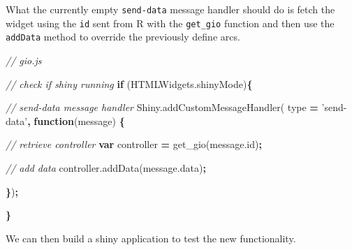 \documentclass[10pt,]{krantz}
\makeatletter
\newenvironment{Shaded}{\begin{snugshade}}{\end{snugshade}}
\newcommand{\AttributeTok}[1]{\textcolor[rgb]{0.61,0.61,0.61}{#1}}
\newcommand{\CommentTok}[1]{\textcolor[rgb]{0.37,0.37,0.37}{\textit{#1}}}
\newcommand{\ControlFlowTok}[1]{\textcolor[rgb]{0.27,0.27,0.27}{\textbf{#1}}}
\newcommand{\KeywordTok}[1]{\textcolor[rgb]{0.27,0.27,0.27}{\textbf{#1}}}
\newcommand{\NormalTok}[1]{#1}
\newcommand{\OperatorTok}[1]{\textcolor[rgb]{0.43,0.43,0.43}{\textbf{#1}}}
\newcommand{\StringTok}[1]{\textcolor[rgb]{0.5,0.5,0.5}{#1}}
\newcommand{\VariableTok}[1]{\textcolor[rgb]{0,0,0}{#1}}
\newenvironment{kframe}{%
\medskip{}
\setlength{\fboxsep}{.8em}
 \def\at@end@of@kframe{}%
 \ifinner\ifhmode%
  \def\at@end@of@kframe{\end{minipage}}%
  \begin{minipage}{\columnwidth}%
 \fi\fi%
 \def\FrameCommand##1{\hskip\@totalleftmargin \hskip-\fboxsep
 \colorbox{shadecolor}{##1}\hskip-\fboxsep
     \hskip-\linewidth \hskip-\@totalleftmargin \hskip\columnwidth}%
 \MakeFramed {\advance\hsize-\width
   \@totalleftmargin\z@ \linewidth\hsize
   \@setminipage}}%
 {\par\unskip\endMakeFramed%
 \at@end@of@kframe}
\renewenvironment{Shaded}{\begin{kframe}}{\end{kframe}}
\makeatother
\begin{document}
What the currently empty \texttt{send-data} message handler should do is fetch the widget using the \texttt{id} sent from R with the \texttt{get\_gio} function and then use the \texttt{addData} method to override the previously define arcs.

\begin{Shaded}
\begin{Highlighting}[]
\CommentTok{// gio.js}

\CommentTok{// check if shiny running}
\ControlFlowTok{if}\NormalTok{ (}\VariableTok{HTMLWidgets}\NormalTok{.}\AttributeTok{shinyMode}\NormalTok{)}\OperatorTok{\{}

  \CommentTok{// send-data message handler}
  \VariableTok{Shiny}\NormalTok{.}\AttributeTok{addCustomMessageHandler}\NormalTok{(}
\NormalTok{    type }\OperatorTok{=} \StringTok{'send-data'}\OperatorTok{,} \KeywordTok{function}\NormalTok{(message) }\OperatorTok{\{}

    \CommentTok{// retrieve controller}
    \KeywordTok{var}\NormalTok{ controller }\OperatorTok{=} \AttributeTok{get_gio}\NormalTok{(}\VariableTok{message}\NormalTok{.}\AttributeTok{id}\NormalTok{)}\OperatorTok{;}

    \CommentTok{// add data}
    \VariableTok{controller}\NormalTok{.}\AttributeTok{addData}\NormalTok{(}\VariableTok{message}\NormalTok{.}\AttributeTok{data}\NormalTok{)}\OperatorTok{;}

  \OperatorTok{\}}\NormalTok{)}\OperatorTok{;}

\OperatorTok{\}}
\end{Highlighting}
\end{Shaded}

We can then build a shiny application to test the new functionality.
\end{document}
